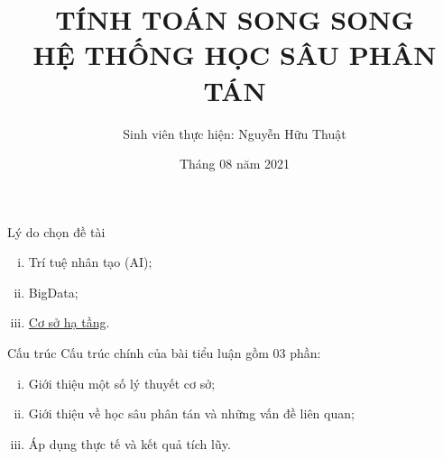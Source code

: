 \documentclass[notheorems,hyperref={bookmarks=true}]{beamer}
\theoremstyle{plain}
\numberwithin{equation}{section}
\begin{document}
\title[Tính Toán Song Song]
{TÍNH TOÁN SONG SONG\\HỆ THỐNG HỌC SÂU PHÂN TÁN \\[0.5 cm]}
\author[Nguyễn Hữu Thuật (20185410)]{\large Sinh viên thực hiện: Nguyễn Hữu Thuật\\[0.5 cm]} 

\date{Tháng 08 năm 2021}
\begin{footnotesize}
\begin{frame}
	\frametitle{}
	\maketitle
\end{frame}


\begin{frame}{Lý do chọn đề tài}
\begin{enumerate}[i.]
	\item Trí tuệ nhân tạo (AI); \pause
	\item BigData;  \pause
	\item \underline{Cơ sở hạ tầng}.
\end{enumerate}
\end{frame}

\begin{frame}{Cấu trúc}
Cấu trúc chính của bài tiểu luận gồm 03 phần:
\begin{enumerate}[i.]
	\item Giới thiệu một số lý thuyết cơ sở;
	\item Giới thiệu về học sâu phân tán và những vấn đề liên quan;
	\item Áp dụng thực tế và kết quả tích lũy.
\end{enumerate}
\end{frame}


\end{footnotesize}
\end{document}

